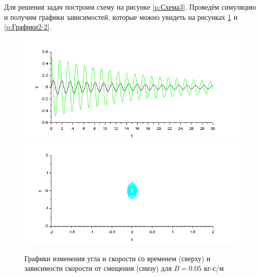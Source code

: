 \documentclass[a4paper, 12pt]{article}
\begin{document}
Для решения задач построим схему на рисунке \ref{p:Схема3}. Проведём симуляцию и получим графики зависимостей, которые можно увидеть на рисунках \ref{p:Графики2-1} и \ref{p:Графики2-2}.

\begin{figure}[h!]
	\centering
	\includegraphics[scale=0.8]{graph2-1}
	\includegraphics[scale=0.8]{graph2-2}
	\caption{Графики изменения угла и скорости со временем (сверху) и зависимости скорости от смещения (снизу) для $B = 0.05$ кг-с/м }
	\label{p:Графики2-1}
\end{figure}
\end{document}
